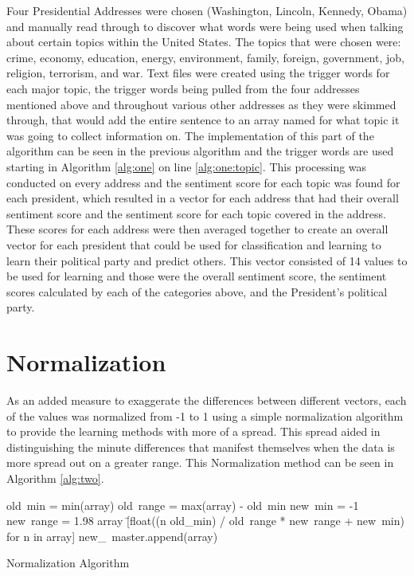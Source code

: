 Four Presidential Addresses were chosen (Washington, Lincoln, Kennedy, Obama) and manually read through to discover what words were being used when talking about certain topics within the United States.
The topics that were chosen were: crime, economy, education, energy, environment, family, foreign, government, job, religion, terrorism, and war.
Text files were created using the trigger words for each major topic, the trigger words being pulled from the four addresses mentioned above and throughout various other addresses as they were skimmed through, that would add the entire sentence to an array named for what topic it was going to collect information on.
The implementation of this part of the algorithm can be seen in the previous algorithm and the trigger words are used starting in Algorithm \ref{alg:one} on line \ref{alg:one:topic}.
This processing was conducted on every address and the sentiment score for each topic was found for each president, which resulted in a vector for each address that had their overall sentiment score and the sentiment score for each topic covered in the address.
These scores for each address were then averaged together to create an overall vector for each president that could be used for classification and learning to learn their political party and predict others.
This vector consisted of 14 values to be used for learning and those were the overall sentiment score, the sentiment scores calculated by each of the categories above, and the President's political party.

\section{Normalization}
As an added measure to exaggerate the differences between different vectors, each of the values was normalized from -1 to 1 using a simple normalization algorithm to provide the learning methods with more of a spread.
This spread aided in distinguishing the minute differences that manifest themselves when the data is more spread out on a greater range.
This Normalization method can be seen in Algorithm \ref{alg:two}.

\begin{singlespace}
\begin{algorithm}[H]
\DontPrintSemicolon
{}
\BlankLine
{}
	{old\ min = min(array)\;
	old\ range = max(array) - old\ min\;
    	new\ min = -1\;
   	new\ range = 1.98\;
    	array \= [float((n \- old\_min) / old\ range * new\ range + new\ min) for n in array]\;
	new\_\ master.append(array)}
\caption{Normalization Algorithm}
\label{alg:two}
\end{algorithm}
\end{singlespace}


